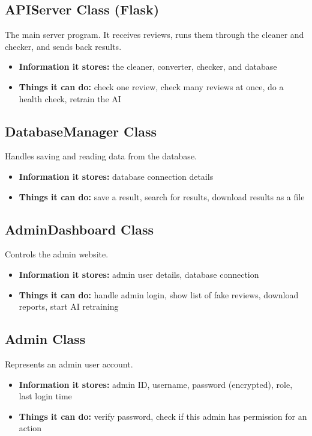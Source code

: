 \documentclass[10pt, a4paper]{report}
\begin{document}
\subsection{APIServer Class (Flask)}
The main server program. It receives reviews, runs them through the cleaner and checker, and sends back results.

\begin{itemize}
  \item \textbf{Information it stores:} the cleaner, converter, checker, and database
  \item \textbf{Things it can do:} check one review, check many reviews at once, do a health check, retrain the AI
\end{itemize}

\subsection{DatabaseManager Class}
Handles saving and reading data from the database.

\begin{itemize}
  \item \textbf{Information it stores:} database connection details
  \item \textbf{Things it can do:} save a result, search for results, download results as a file
\end{itemize}

\subsection{AdminDashboard Class}
Controls the admin website.

\begin{itemize}
  \item \textbf{Information it stores:} admin user details, database connection
  \item \textbf{Things it can do:} handle admin login, show list of fake reviews, download reports, start AI retraining
\end{itemize}

\subsection{Admin Class}
Represents an admin user account.

\begin{itemize}
  \item \textbf{Information it stores:} admin ID, username, password (encrypted), role, last login time
  \item \textbf{Things it can do:} verify password, check if this admin has permission for an action
\end{itemize}
\end{document}

